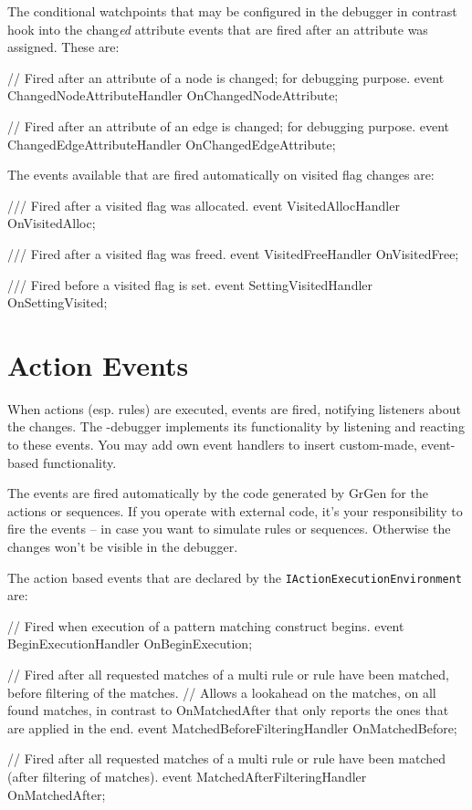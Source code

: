 The conditional watchpoints that may be configured in the debugger in contrast hook into the chang\emph{ed} attribute events that are fired after an attribute was assigned. These are:

\begin{csharplet}
// Fired after an attribute of a node is changed; for debugging purpose.
event ChangedNodeAttributeHandler OnChangedNodeAttribute;

// Fired after an attribute of an edge is changed; for debugging purpose.
event ChangedEdgeAttributeHandler OnChangedEdgeAttribute;
\end{csharplet}

The events available that are fired automatically on visited flag changes are:

\begin{csharplet}
/// Fired after a visited flag was allocated.
event VisitedAllocHandler OnVisitedAlloc;

/// Fired after a visited flag was freed.
event VisitedFreeHandler OnVisitedFree;

/// Fired before a visited flag is set.
event SettingVisitedHandler OnSettingVisited;
\end{csharplet}


\section{Action Events}\label{sec:actionevent}

When actions (esp. rules) are executed, events are fired, notifying listeners about the changes.
The \GrShell-debugger implements its functionality by listening and reacting to these events.
You may add own event handlers to insert custom-made, event-based functionality.

The events are fired automatically by the code generated by GrGen for the actions or sequences.
If you operate with external code, it's your responsibility to fire the events -- in case you want to simulate rules or sequences.
Otherwise the changes won't be visible in the debugger.

The action based events that are declared by the \texttt{IActionExecutionEnvironment} are:

\begin{csharplet}
// Fired when execution of a pattern matching construct begins.
event BeginExecutionHandler OnBeginExecution;

// Fired after all requested matches of a multi rule or rule have been matched, before filtering of the matches.
// Allows a lookahead on the matches, on all found matches, in contrast to OnMatchedAfter that only reports the ones that are applied in the end.
event MatchedBeforeFilteringHandler OnMatchedBefore;

// Fired after all requested matches of a multi rule or rule have been matched (after filtering of matches).
event MatchedAfterFilteringHandler OnMatchedAfter;
\end{csharplet}

